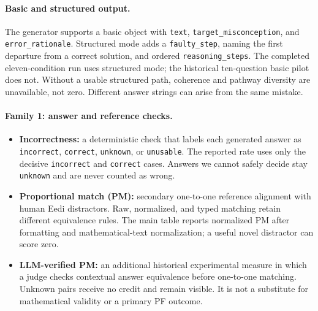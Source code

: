 \paragraph{Basic and structured output.} The generator supports a basic object with \texttt{text}, \texttt{target\_misconception}, and \texttt{error\_rationale}. Structured mode adds a \texttt{faulty\_step}, naming the first departure from a correct solution, and ordered \texttt{reasoning\_steps}. The completed eleven-condition run uses structured mode; the historical ten-question basic pilot does not. Without a usable structured path, coherence and pathway diversity are unavailable, not zero. Different answer strings can arise from the same mistake.

\paragraph{Family 1: answer and reference checks.}
\begin{itemize}
    \item \textbf{Incorrectness:} a deterministic check that labels each generated answer as \texttt{incorrect}, \texttt{correct}, \texttt{unknown}, or \texttt{unusable}. The reported rate uses only the decisive \texttt{incorrect} and \texttt{correct} cases. Answers we cannot safely decide stay \texttt{unknown} and are never counted as wrong.
    \item \textbf{Proportional match (PM):} secondary one-to-one reference alignment with human Eedi distractors. Raw, normalized, and typed matching retain different equivalence rules. The main table reports normalized PM after formatting and mathematical-text normalization; a useful novel distractor can score zero.
    \item \textbf{LLM-verified PM:} an additional historical experimental measure in which a judge checks contextual answer equivalence before one-to-one matching. Unknown pairs receive no credit and remain visible. It is not a substitute for mathematical validity or a primary PF outcome.
\end{itemize}

